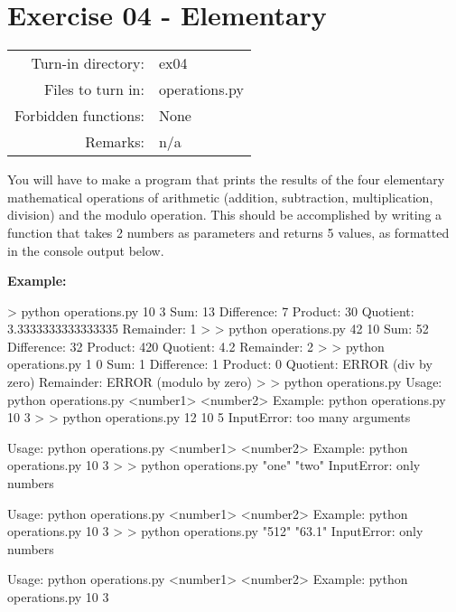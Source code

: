 \documentclass[]{article}
\newenvironment{Shaded}{\begin{snugshade}}{\end{snugshade}}
\newcommand{\NormalTok}[1]{\textcolor[rgb]{0.81,0.81,0.76}{#1}}
\begin{document}
\clearpage

\hypertarget{exercise-04---elementary-1}{%
\section{Exercise 04 - Elementary}\label{exercise-04---elementary-1}}

\begin{longtable}[]{@{}rl@{}}
\toprule
\endhead
Turn-in directory: & ex04\tabularnewline
Files to turn in: & operations.py\tabularnewline
Forbidden functions: & None\tabularnewline
Remarks: & n/a\tabularnewline
\bottomrule
\end{longtable}

You will have to make a program that prints the results of the four
elementary mathematical operations of arithmetic (addition, subtraction,
multiplication, division) and the modulo operation. This should be
accomplished by writing a function that takes 2 numbers as parameters
and returns 5 values, as formatted in the console output below.

\textbf{Example:}

\begin{Shaded}
\begin{Highlighting}[]
\NormalTok{> python operations.py 10 3}
\NormalTok{Sum:         13}
\NormalTok{Difference:  7}
\NormalTok{Product:     30}
\NormalTok{Quotient:    3.3333333333333335}
\NormalTok{Remainder:   1}
\NormalTok{>}
\NormalTok{> python operations.py 42 10}
\NormalTok{Sum:         52}
\NormalTok{Difference:  32}
\NormalTok{Product:     420}
\NormalTok{Quotient:    4.2}
\NormalTok{Remainder:   2}
\NormalTok{>}
\NormalTok{> python operations.py 1 0}
\NormalTok{Sum:         1}
\NormalTok{Difference:  1}
\NormalTok{Product:     0}
\NormalTok{Quotient:    ERROR (div by zero)}
\NormalTok{Remainder:   ERROR (modulo by zero)}
\NormalTok{>}
\NormalTok{> python operations.py}
\NormalTok{Usage: python operations.py <number1> <number2>}
\NormalTok{Example:}
\NormalTok{    python operations.py 10 3}
\NormalTok{>}
\NormalTok{> python operations.py 12 10 5}
\NormalTok{InputError: too many arguments}

\NormalTok{Usage: python operations.py <number1> <number2>}
\NormalTok{Example:}
\NormalTok{    python operations.py 10 3}
\NormalTok{>}
\NormalTok{> python operations.py "one" "two"}
\NormalTok{InputError: only numbers}

\NormalTok{Usage: python operations.py <number1> <number2>}
\NormalTok{Example:}
\NormalTok{    python operations.py 10 3}
\NormalTok{>}
\NormalTok{> python operations.py "512" "63.1"}
\NormalTok{InputError: only numbers}

\NormalTok{Usage: python operations.py <number1> <number2>}
\NormalTok{Example:}
\NormalTok{    python operations.py 10 3}
\end{Highlighting}
\end{Shaded}
\end{document}
